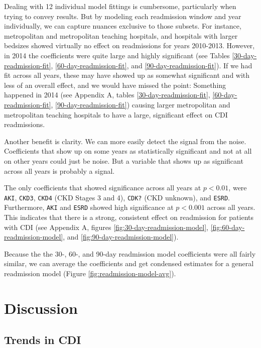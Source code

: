 \documentclass[12pt]{ociamthesis}\usepackage[]{graphicx}\usepackage[]{color}
\begin{document}
Dealing with 12 individual model fittings is cumbersome, particularly when trying to convey results.
But by modeling each readmission window and year individually, we can capture nuances exclusive to those subsets.
For instance, metropolitan and metropolitan teaching hospitals, and hospitals with larger bedsizes showed virtually no effect on readmissions for years 2010-2013. 
However, in 2014 the coefficients were quite large and highly significant (see Tables \ref{30-day-readmission-fit}, \ref{60-day-readmission-fit}, and \ref{90-day-readmission-fit}).
If we had fit across all years, these may have showed up as somewhat significant and with less of an overall effect, and we would have missed the point:
Something happened in 2014 (see Appendix A, tables \ref{30-day-readmission-fit}, \ref{60-day-readmission-fit}, \ref{90-day-readmission-fit}) 
causing larger metropolitan and metropolitan teaching hospitals to have a large, significant effect on CDI readmissions. 




Another benefit is clarity. We can more easily detect the signal from the noise. Coefficients that show up on some years as statistically significant and not at all
on other years could just be noise. But a variable that shows up as significant across all years is probably a signal. 

The only coefficients that showed significance across all years at $p < 0.01$, were \texttt{AKI}, \texttt{CKD3}, \texttt{CKD4} (CKD Stages 3 and 4), 
\texttt{CDK?} (CKD unknown), and \texttt{ESRD}. Furthermore, \texttt{AKI} and \texttt{ESRD} showed high significance at $p < 0.001$ across all years.
This indicates that there is a strong, consistent effect on readmission for patients with CDI
(see Appendix A, figures \ref{fig:30-day-readmission-model}, \ref{fig:60-day-readmission-model}, and \ref{fig:90-day-readmission-model}).

Because the the 30-, 60-, and 90-day readmission model coefficients were all fairly similar, 
we can average the coefficients and get condensed estimates for a general readmission model (Figure \ref{fig:readmission-model-avg}).




\chapter{Discussion}

\section{Trends in CDI}
\end{document}
